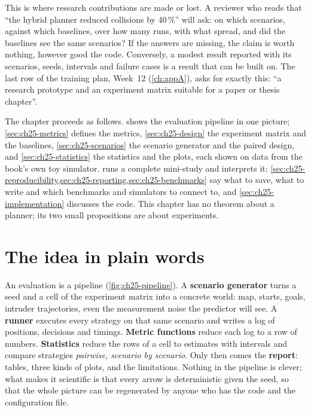 This is where research contributions are made or lost. A reviewer who reads
that ``the hybrid planner reduced collisions by 40\,\%'' will ask: on which
scenarios, against which baselines, over how many runs, with what spread, and
did the baselines see the same scenarios? If the answers are missing, the
claim is worth nothing, however good the code. Conversely, a modest result
reported with its scenarios, seeds, intervals and failure cases is a result
that can be built on. The last row of the training plan, Week~12
(\cref{ch:appA}), asks for exactly this: ``a research prototype and an
experiment matrix suitable for a paper or thesis chapter''.

The chapter proceeds as follows.  shows the
evaluation pipeline in one picture; \cref{sec:ch25-metrics} defines the
metrics, \cref{sec:ch25-design} the experiment matrix and the baselines,
\cref{sec:ch25-scenarios} the scenario generator and the paired design, and
\cref{sec:ch25-statistics} the statistics and the plots, each shown on data
from the book's own toy simulator.  runs a complete
mini-study and interprets it;
\cref{sec:ch25-reproducibility,sec:ch25-reporting,sec:ch25-benchmarks} say
what to save, what to write and which benchmarks and simulators to connect
to, and \cref{sec:ch25-implementation} discusses the code. This chapter has
no theorem about a planner; its two small propositions are about
experiments.

\section{The idea in plain words}
\label{sec:ch25-intuition}

An evaluation is a pipeline (\cref{fig:ch25-pipeline}). A
\textbf{scenario generator} turns a seed and a
cell of the experiment matrix into a concrete world: map, starts, goals,
intruder trajectories, even the measurement noise the predictor will see. A
\textbf{runner} executes every strategy on that same scenario and writes a
log of positions, decisions and timings. \textbf{Metric functions} reduce
each log to a row of numbers. \textbf{Statistics} reduce the rows of a cell
to estimates with intervals and compare strategies \emph{pairwise, scenario
by scenario}. Only then comes the \textbf{report}: tables, three kinds of
plots, and the limitations. Nothing in the pipeline is clever; what makes it
scientific is that every arrow is deterministic given the seed, so that the
whole picture can be regenerated by anyone who has the code and the
configuration file.

